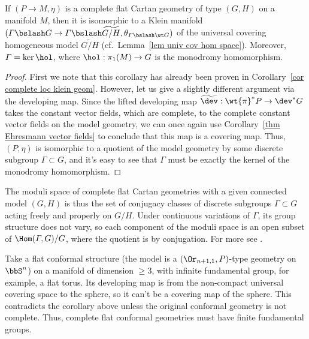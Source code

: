 \begin{cor}\label{cor uniformization of complete flat cartan}
    If $(P\to M,\eta)$ is a complete flat Cartan geometry of type $(G,H)$ on a manifold $M$, then it is isomorphic to a Klein manifold $(\varGamma\bslash G\to \varGamma\bslash \widetilde{G\slash H},\theta_{\varGamma\bslash \wt G})$ of the universal covering homogeneous model $\widetilde{G\slash H}$ (cf.\ Lemma~\ref{lem univ cov hom space}). Moreover, $\varGamma=\ker\hol$, where $\hol:\pi_1(M)\to G$ is the monodromy homomorphism.
\end{cor}
\begin{proof}
    First we note that this corollary has already been proven in Corollary~\ref{cor complete loc klein geom}. However, let us give a slightly different argument via the developing map. Since the lifted developing map $\widetilde{\dev}:\wt{\pi}^\ast P\to \dev^\ast G$ takes the constant vector fields, which are complete, to the complete constant vector fields on the model geometry, we can once again use Corollary~\ref{thm Ehresmann vector fields} to conclude that this map is a covering map. Thus, $(P,\eta)$ is isomorphic to a quotient of the model geometry by some discrete subgroup $\varGamma\subset G$, and it's easy to see that $\varGamma$ must be exactly the kernel of the monodromy homomorphism.
\end{proof}

\begin{rem}
    The moduli space of complete flat Cartan geometries with a given connected model $(G,H)$ is thus the set of conjugacy classes of discrete subgroups $\varGamma\subset G$ acting freely and properly on $G\slash H$. Under continuous variations of $\varGamma$, its group structure does not vary, so each component of the moduli space is an open subset of $\Hom(\varGamma,G)\slash G$, where the quotient is by conjugation. For more see \cite[p.~165]{Goldman}.
\end{rem}

\begin{example}\label{ex flat conformal structures}
    Take a flat conformal structure (the model is a $(\Or_{n+1,1},P)$-type geometry on $\bbS^n$) on a manifold of dimension $\geq 3$, with infinite fundamental group, for example, a flat torus. Its developing map is from the non-compact universal covering space to the sphere, so it can't be a covering map of the sphere. This contradicts the corollary above unless the original conformal geometry is not complete. Thus, complete flat conformal geometries must have finite fundamental groups.
\end{example}


